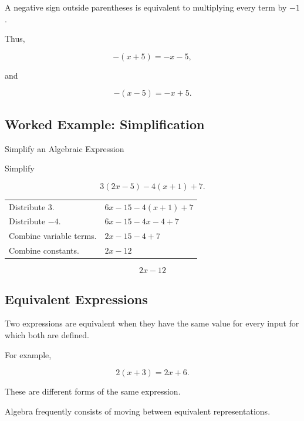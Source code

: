 A negative sign outside parentheses is equivalent to multiplying every term by
\(-1\).

Thus,

\[ -(x+5)=-x-5, \]

and

\[ -(x-5)=-x+5. \]

\subsection{Worked Example: Simplification}
\label{subsec:worked-expression-simplification}

\begin{workedexamplebox}{Simplify an Algebraic Expression}

Simplify

\[ 3(2x-5)-4(x+1)+7. \]

\begin{tabularx}{\textwidth}{@{}>{\raggedright\arraybackslash}p{}X@{}}
Distribute \(3\). & \(6x-15-4(x+1)+7\)\\
Distribute \(-4\). & \(6x-15-4x-4+7\)\\
Combine variable terms. & \(2x-15-4+7\)\\
Combine constants. & \(2x-12\)
\end{tabularx}

\begin{answerbox}
\[ 2x-12 \]
\end{answerbox}
\end{workedexamplebox}

\subsection{Equivalent Expressions}
\label{subsec:equivalent-expressions}

Two expressions are equivalent when they have the same value for every input
for which both are defined.

For example,

\[ 2(x+3)=2x+6. \]

These are different forms of the same expression.

Algebra frequently consists of moving between equivalent representations.

